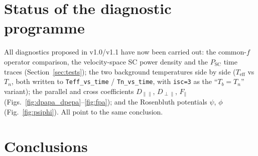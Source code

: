 \documentclass[11pt,a4paper]{article}
\begin{document}
\section{Status of the diagnostic programme}

All diagnostics proposed in v1.0/v1.1 have now been carried out:
the common-$f$ operator comparison, the velocity-space SC power density and the
$P_\text{SC}$ time traces (Section~\ref{sec:tests}); the two background
temperatures side by side ($T_\text{eff}$ vs $T_n$, both written to
\texttt{Teff\_vs\_time} / \texttt{Tn\_vs\_time}, with \texttt{isc=3} as the
``$T_b=T_n$'' variant); the parallel and cross coefficients
$D_{\parallel\parallel}$, $D_{\perp\parallel}$, $F_\parallel$
(Figs.~\ref{fig:dpapa_dpepa}--\ref{fig:fpa}); and the Rosenbluth potentials
$\psi$, $\phi$ (Fig.~\ref{fig:psiphi}). All point to the same conclusion.

\section{Conclusions}
\end{document}
